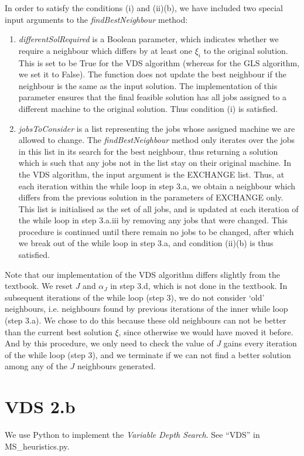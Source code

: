 \documentclass[12pt,a4paper,reqno]{article}
\begin{document}
In order to satisfy the conditions (i) and (ii)(b), we have included two special input arguments to the \textit{findBestNeighbour} method:
\begin{enumerate}
\item \textit{differentSolRequired} is a Boolean parameter, which indicates whether we require a neighbour which differs by at least one $\xi_i$ to the original solution. This is set to be True for the VDS algorithm (whereas for the GLS algorithm, we set it to False). The function does not update the best neighbour if the neighbour is the same as the input solution. The implementation of this parameter ensures that the final feasible solution has all jobs assigned to a different machine to the original solution. Thus condition (i) is satisfied.
\item \textit{jobsToConsider} is a list representing the jobs whose assigned machine we are allowed to change. The \textit{findBestNeighbour} method only iterates over the jobs in this list in its search for the best neighbour, thus returning a solution which is such that any jobs not in the list stay on their original machine. In the VDS algorithm, the input argument is the EXCHANGE list. Thus, at each iteration within the while loop in step 3.a, we obtain a neighbour which differs from the previous solution in the parameters of EXCHANGE only. This list is initialised as the set of all jobs, and is updated at each iteration of the while loop in step 3.a.iii by removing any jobs that were changed. This procedure is continued until there remain no jobs to be changed, after which we break out of the while loop in step 3.a, and condition (ii)(b) is thus satisfied.
\end{enumerate}

Note that our implementation of the VDS algorithm differs slightly from the textbook. We reset $J$ and $\alpha_J$ in step 3.d, which is not done in the textbook. In subsequent iterations of the while loop (step 3), we do not consider `old' neighbours, i.e. neighbours found by previous iterations of the inner while loop (step 3.a). We chose to do this because these old neighbours can not be better than the current best solution $\xi$, since otherwise we would have moved it before. And by this procedure, we only need to check the value of $J$ gains every iteration of the while loop (step 3), and we terminate if we can not find a better solution among any of the $J$ neighbours generated.

\section*{VDS 2.b}
We use Python to implement the \emph{Variable Depth Search}. See ``VDS'' in MS\_heuristics.py.
\end{document}
